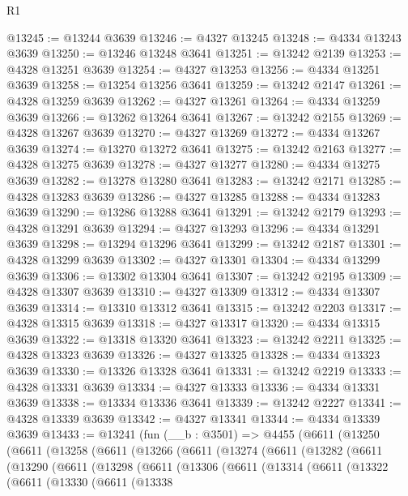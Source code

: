 \begin{lexlean}{R1}
\begin{coremodule}
@13245 := @13244 @3639
@13246 := @4327 @13245
@13248 := @4334 @13243 @3639
@13250 := @13246 @13248 @3641
@13251 := @13242 @2139
@13253 := @4328 @13251 @3639
@13254 := @4327 @13253
@13256 := @4334 @13251 @3639
@13258 := @13254 @13256 @3641
@13259 := @13242 @2147
@13261 := @4328 @13259 @3639
@13262 := @4327 @13261
@13264 := @4334 @13259 @3639
@13266 := @13262 @13264 @3641
@13267 := @13242 @2155
@13269 := @4328 @13267 @3639
@13270 := @4327 @13269
@13272 := @4334 @13267 @3639
@13274 := @13270 @13272 @3641
@13275 := @13242 @2163
@13277 := @4328 @13275 @3639
@13278 := @4327 @13277
@13280 := @4334 @13275 @3639
@13282 := @13278 @13280 @3641
@13283 := @13242 @2171
@13285 := @4328 @13283 @3639
@13286 := @4327 @13285
@13288 := @4334 @13283 @3639
@13290 := @13286 @13288 @3641
@13291 := @13242 @2179
@13293 := @4328 @13291 @3639
@13294 := @4327 @13293
@13296 := @4334 @13291 @3639
@13298 := @13294 @13296 @3641
@13299 := @13242 @2187
@13301 := @4328 @13299 @3639
@13302 := @4327 @13301
@13304 := @4334 @13299 @3639
@13306 := @13302 @13304 @3641
@13307 := @13242 @2195
@13309 := @4328 @13307 @3639
@13310 := @4327 @13309
@13312 := @4334 @13307 @3639
@13314 := @13310 @13312 @3641
@13315 := @13242 @2203
@13317 := @4328 @13315 @3639
@13318 := @4327 @13317
@13320 := @4334 @13315 @3639
@13322 := @13318 @13320 @3641
@13323 := @13242 @2211
@13325 := @4328 @13323 @3639
@13326 := @4327 @13325
@13328 := @4334 @13323 @3639
@13330 := @13326 @13328 @3641
@13331 := @13242 @2219
@13333 := @4328 @13331 @3639
@13334 := @4327 @13333
@13336 := @4334 @13331 @3639
@13338 := @13334 @13336 @3641
@13339 := @13242 @2227
@13341 := @4328 @13339 @3639
@13342 := @4327 @13341
@13344 := @4334 @13339 @3639
@13433 := @13241
    (fun (__b : @3501) =>
    @4455
      (@6611
        (@13250
          (@6611
            (@13258
              (@6611
                (@13266
                  (@6611
                    (@13274
                      (@6611
                        (@13282
                          (@6611
                            (@13290
                              (@6611
                                (@13298
                                  (@6611
                                    (@13306
                                      (@6611
                                        (@13314
                                          (@6611
                                            (@13322
                                              (@6611
                                                (@13330
                                                  (@6611
                                                    (@13338

\end{coremodule}
\end{lexlean}
